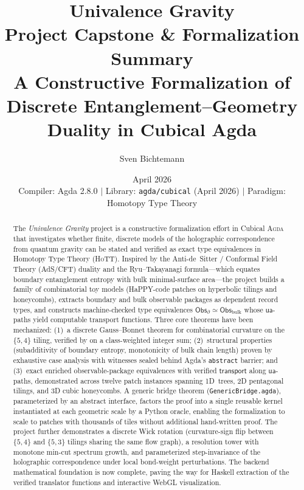 \documentclass[11pt, a4paper]{article}
\title{%
  \textbf{Univalence Gravity} \\[6pt]
  \large Project Capstone \& Formalization Summary \\[4pt]
  \normalsize A Constructive Formalization of Discrete
  Entanglement--Geometry Duality in Cubical Agda}
\author{Sven Bichtemann}
\date{April 2026 \\ \smallskip
  \small Compiler: Agda 2.8.0 \quad $\mid$ \quad
  Library: \texttt{agda/cubical} (April 2026) \quad $\mid$ \quad
  Paradigm: Homotopy Type Theory}
\theoremstyle{plain}
\theoremstyle{definition}
\newcommand{\Agda}{\textsc{Agda}}
\newcommand{\HoTT}{\textsc{HoTT}}
\newcommand{\RT}{Ryu--Takayanagi}
\newcommand{\AdS}{AdS}
\newcommand{\CFT}{CFT}
\newcommand{\ua}{\mathsf{ua}}
\newcommand{\transport}{\mathsf{transport}}
\newcommand{\refl}{\mathsf{refl}}
\newcommand{\Obs}{\mathsf{Obs}}
\newcommand{\PD}{\mathsf{PatchData}}
\begin{document}
\maketitle

\begin{abstract}
\noindent
The \emph{Univalence Gravity} project is a constructive
formalization effort in Cubical \Agda{} that investigates whether
finite, discrete models of the holographic correspondence from
quantum gravity can be stated and verified as exact type
equivalences in Homotopy Type Theory (\HoTT{}).  Inspired by the
Anti-de~Sitter / Conformal Field Theory (\AdS/\CFT{}) duality and the
\RT{} formula---which equates boundary entanglement entropy with
bulk minimal-surface area---the project builds a family of
combinatorial toy models (HaPPY-code patches on hyperbolic tilings
and honeycombs), extracts boundary and bulk observable packages as
dependent record types, and constructs machine-checked type
equivalences $\Obs_\partial \simeq \Obs_{\mathrm{bulk}}$ whose
$\ua$-paths yield computable transport functions.  Three core
theorems have been mechanized: (1)~a discrete Gauss--Bonnet theorem
for combinatorial curvature on the $\{5,4\}$ tiling, verified by
\refl{} on a class-weighted integer sum; (2)~structural properties
(subadditivity of boundary entropy, monotonicity of bulk chain
length) proven by exhaustive case analysis with witnesses sealed
behind Agda's \texttt{abstract} barrier; and (3)~exact enriched
observable-package equivalences with verified $\transport$ along
$\ua$-paths, demonstrated across twelve patch instances spanning
1D~trees, 2D pentagonal tilings, and 3D cubic honeycombs.
A generic bridge theorem (\texttt{GenericBridge.agda}),
parameterized by an abstract \PD{} interface, factors the proof
into a single reusable kernel instantiated at each geometric scale
by a Python oracle, enabling the formalization to scale to patches
with thousands of tiles without additional hand-written proof.
The project further demonstrates a discrete Wick rotation
(curvature-sign flip between $\{5,4\}$ and $\{5,3\}$ tilings
sharing the same flow graph), a resolution tower with monotone
min-cut spectrum growth, and parameterized step-invariance of the
holographic correspondence under local bond-weight perturbations.
The backend mathematical foundation is now complete, paving the
way for Haskell extraction of the verified translator functions and
interactive WebGL visualization.
\end{abstract}
\end{document}
